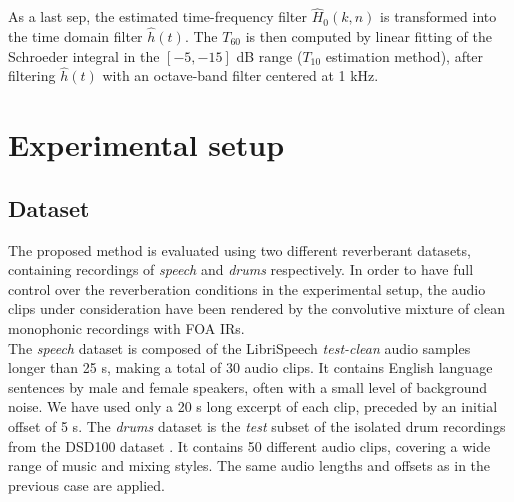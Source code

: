 As a last sep, the estimated time-frequency filter $\hat{H}_0(k,n)$ is transformed into the time domain filter $\hat{h}(t)$. The $T_{60}$ is then computed by linear fitting of the Schroeder integral 
in the $[-5, -15] $ dB range ($T_{10}$ estimation method), after filtering $\hat{h}(t)$ with an octave-band filter centered at 1 kHz. 




\section{Experimental setup}
\label{sec:experimental}

\vspace{-2mm}
\subsection{Dataset}

The proposed method is evaluated using two different reverberant datasets, containing recordings of \textit{speech} and \textit{drums} respectively. 
In order to have full control over the reverberation conditions in the experimental setup, the audio clips under consideration have been rendered by the convolutive mixture of clean monophonic recordings with FOA IRs.\\

The \textit{speech} dataset is composed of the LibriSpeech \cite{panayotov2015librispeech} \textit{test-clean} audio samples longer than 25 s, making a total of 30 audio clips. It contains English language sentences by male and female speakers, often with a small level of background noise. We have used only a 20 s long excerpt of each clip, preceded by an initial offset of 5 s. 
The \textit{drums} dataset is the \textit{test} subset of the isolated drum recordings from the DSD100 dataset \cite{SiSEC16}. It contains 50 different audio clips, covering a wide range of music and mixing styles. The same audio lengths and offsets as in the previous case are applied.

